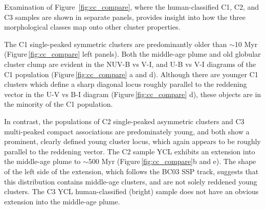 \documentclass[linenumbers]{aastex63}
\begin{document}
{Examination of Figure~\ref{fig:cc_compare}, where the human-classified C1, C2, and C3 samples are shown in separate panels, provides insight into how the three morphological classes map onto other cluster properties.  

The C1 single-peaked symmetric clusters are predominantly older than $\sim$10 Myr (Figure\,\ref{fig:cc_compare} left panels).  Both the middle-age plume and old globular cluster clump are evident in the NUV-B vs V-I, and U-B vs V-I diagrams of the C1 population (Figure\,\ref{fig:cc_compare} a and d). %
Although there are younger C1 clusters which define a sharp diagonal locus roughly parallel to the reddening vector in the U-V vs B-I diagram (Figure\,\ref{fig:cc_compare} d), these objects are in the minority of the C1 population.  

In contrast, the populations of C2 single-peaked asymmetric clusters and C3 multi-peaked compact associations are predominately young, and both show a prominent, clearly defined young cluster locus, which again appears to be roughly parallel to the reddening vector.  The C2 sample YCL exhibits an extension into the middle-age plume to $\sim$500 Myr (Figure\,\ref{fig:cc_compare}b and e).  The shape of the left side of the extension, which follows the BC03 SSP track, suggests that this distribution contains middle-age clusters, and are not solely reddened young clusters.  The C3 YCL human-classified (bright) sample does not have an obvious extension into the middle-age plume.

}
\end{document}
